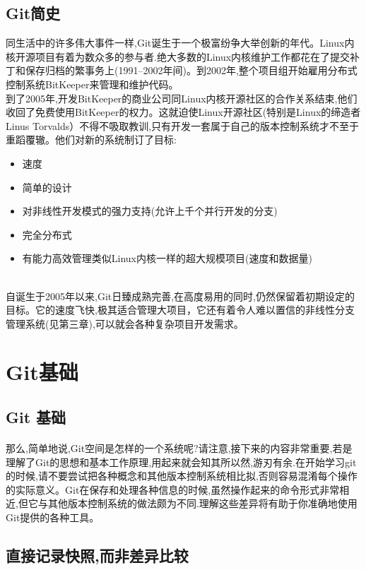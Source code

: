 \documentclass{book}
\begin{document}
	\subsection{Git简史}
	同生活中的许多伟大事件一样,Git诞生于一个极富纷争大举创新的年代。Linux内核开源项目有着为数众多的参与者.绝大多数的Linux内核维护工作都花在了提交补丁和保存归档的繁事务上(1991--2002年间)。到2002年,整个项目组开始雇用分布式控制系统BitKeeper来管理和维护代码。\\
	到了2005年,开发BitKeeper的商业公司同Linux内核开源社区的合作关系结束,他们收回了免费使用BitKeeper的权力。这就迫使Linux开源社区(特别是Linux的缔造者Linus Torvalds）不得不吸取教训,只有开发一套属于自己的版本控制系统才不至于重蹈覆辙。他们对新的系统制订了目标:\\
	\begin{itemize}
		\item 速度
		\item 简单的设计 
		\item 对非线性开发模式的强力支持(允许上千个并行开发的分支)
		\item 完全分布式
		\item 有能力高效管理类似Linux内核一样的超大规模项目(速度和数据量)
	\end{itemize}\\
	自诞生于2005年以来,Git日臻成熟完善,在高度易用的同时,仍然保留着初期设定的目标。它的速度飞快,极其适合管理大项目，它还有着令人难以置信的非线性分支管理系统(见第三章),可以就会各种复杂项目开发需求。\\


	\section{Git基础}
	\subsection{Git 基础}
	\paragraph{}
	那么,简单地说,Git空间是怎样的一个系统呢?请注意,接下来的内容非常重要,若是理解了Git的思想和基本工作原理,用起来就会知其所以然,游刃有余.在开始学习git的时候,请不要尝试把各种概念和其他版本控制系统相比拟,否则容易混淆每个操作的实际意义。Git在保存和处理各种信息的时候,虽然操作起来的命令形式非常相近,但它与其他版本控制系统的做法颇为不同.理解这些差异将有助于你准确地使用Git提供的各种工具。\\
	\subsection{直接记录快照,而非差异比较}
\end{document}
